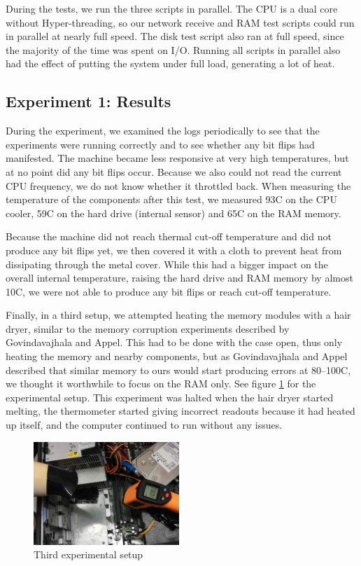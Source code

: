 \documentclass[conference]{IEEEtran}
\begin{document}
During the tests, we run the three scripts in parallel. The CPU is a dual core
without Hyper-threading, so our network receive and RAM test scripts could run
in parallel at nearly full speed. The disk test script also ran at full speed,
since the majority of the time was spent on I/O. Running all scripts in
parallel also had the effect of putting the system under full load, generating
a lot of heat.

\subsection{Experiment 1: Results}\label{sub:exp1r}

During the experiment, we examined the logs periodically to see that the
experiments were running correctly and to see whether any bit flips had
manifested. The machine became less responsive at very high temperatures, but
at no point did any bit flips occur. Because we also could not read the current
CPU frequency, we do not know whether it throttled back. When measuring the
temperature of the components after this test, we measured 93\degree{}C on the
CPU cooler, 59\degree{}C on the hard drive (internal sensor) and 65\degree{}C
on the RAM memory.

Because the machine did not reach thermal cut-off temperature and did not
produce any bit flips yet, we then covered it with a cloth to prevent heat from
dissipating through the metal cover. While this had a bigger impact on the
overall internal temperature, raising the hard drive and RAM memory by almost
10\degree{}C, we were not able to produce any bit flips or reach cut-off
temperature.

Finally, in a third setup, we attempted heating the memory modules with a hair
dryer, similar to the memory corruption experiments described by Govindavajhala
and Appel\cite{jvm}. This had to be done with the case open, thus only heating
the memory and nearby components, but as Govindavajhala and Appel described
that similar memory to ours would start producing errors at 80--100\degree{}C,
we thought it worthwhile to focus on the RAM only. See figure
\ref{fig:hairdryer} for the experimental setup. This experiment was halted when
the hair dryer started melting, the thermometer started giving incorrect
readouts because it had heated up itself, and the computer continued to run
without any issues.

\begin{figure}
	\centering
	\includegraphics[width=0.49\textwidth]{hairdryer.jpg}
	\caption{Third experimental setup}
	\label{fig:hairdryer}
\end{figure}
\end{document}
